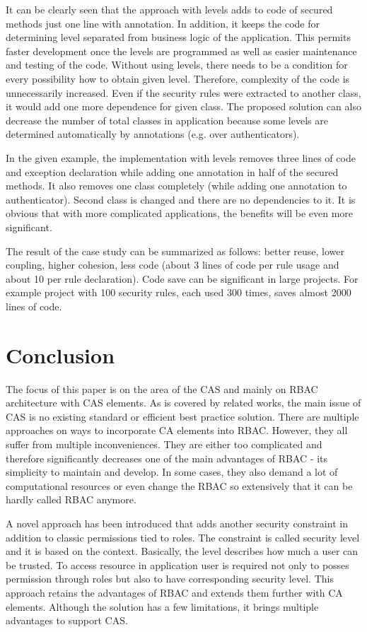 \documentclass{sig-alternate}
\begin{document}
It can be clearly seen that the approach with levels adds to code of secured methods just one line with annotation. In addition, it keeps the code for determining level separated from business logic of the application. This permits faster development once the levels are programmed as well as easier maintenance and testing of the code. Without using levels, there needs to be a condition for every possibility how to obtain given level. Therefore, complexity of the code is unnecessarily increased. Even if the security rules were extracted to another class, it would add one more dependence for given class. The proposed solution can also decrease the number of total classes in application because some levels are determined automatically by annotations (e.g. over authenticators).

In the given example, the implementation with levels removes three lines of code and exception declaration while adding one annotation in half of the secured methods. It also removes one class completely (while adding one annotation to authenticator). Second class is changed and there are no dependencies to it. It is obvious that with more complicated applications, the benefits will be even more significant.

The result of the case study can be summarized as follows: better reuse, lower coupling, higher cohesion, less code (about 3 lines of code per rule usage and about 10 per rule declaration). Code save can be significant in large projects. For example project with 100 security rules, each used 300 times, saves almost 2000 lines of code.

\section{Conclusion}
The focus of this paper is on the area of the CAS and mainly on RBAC architecture with CAS elements. As is covered by related works, the main issue of CAS is no existing standard or efficient best practice solution. There are multiple approaches on ways to incorporate CA elements into RBAC. However, they all suffer from multiple inconveniences. They are either too complicated and therefore significantly decreases one of the main advantages of RBAC - its simplicity to maintain and develop. In some cases, they also demand a lot of computational resources or even change the RBAC so extensively that it can be hardly called RBAC anymore.

A novel approach has been introduced that adds another security constraint in addition to classic permissions tied to roles. The constraint is called security level and it is based on the context. Basically, the level describes how much a user can be trusted. To access resource in application user is required not only to posses permission through roles but also to have corresponding security level. This approach retains the advantages of RBAC and extends them further with CA elements. Although the solution has a few limitations, it brings multiple advantages to support CAS. 
\end{document}
